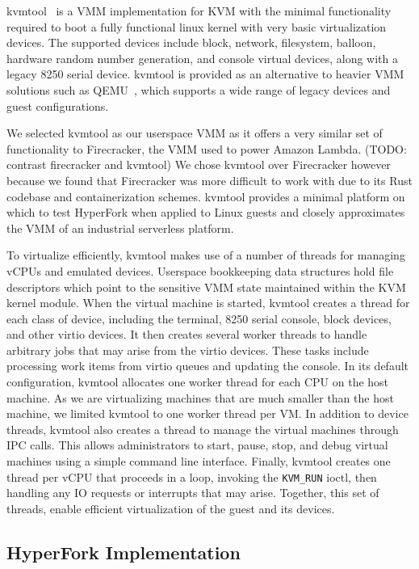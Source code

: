 kvmtool~\cite{kvmtool} is a VMM implementation for KVM with the minimal
functionality required to boot a fully functional linux kernel with very basic
virtualization devices.  The supported devices include block, network,
filesystem, balloon, hardware random number generation, and console virtual
devices, along with a legacy 8250 serial device. kvmtool is provided as an
alternative to heavier VMM solutions such as QEMU~\cite{qemu}, which supports a
wide range of legacy devices and guest configurations.

We selected kvmtool as our userspace VMM as it offers a very similar set of
functionality to Firecracker, the VMM used to power Amazon Lambda. (TODO:
contrast firecracker and kvmtool) We chose kvmtool over Firecracker however
because we found that Firecracker was more difficult to work with due to its
Rust codebase and containerization schemes. kvmtool provides a minimal
platform on which to test HyperFork when applied to Linux guests and closely
approximates the VMM of an industrial serverless platform.

To virtualize efficiently, kvmtool makes use of a number of threads for
managing vCPUs and emulated devices. Userspace bookkeeping data structures hold
file descriptors which point to the sensitive VMM state maintained within the
KVM kernel module. When the virtual machine is started, kvmtool creates a
thread for each class of device, including the terminal, 8250 serial console,
block devices, and other virtio devices. It then creates several worker threads
to handle arbitrary jobs that may arise from the virtio devices. These tasks
include processing work items from virtio queues and updating the console. In
its default configuration, kvmtool allocates one worker thread for each CPU on
the host machine. As we are virtualizing machines that are much smaller than
the host machine, we limited kvmtool to one worker thread per VM. In addition
to device threads, kvmtool also creates a thread to manage the virtual machines
through IPC calls. This allows administrators to start, pause, stop, and debug
virtual machines using a simple command line interface. Finally, kvmtool
creates one thread per vCPU that proceeds in a loop, invoking the
\texttt{KVM\_RUN} ioctl, then handling any IO requests or interrupts that may
arise. Together, this set of threads, enable efficient virtualization of the
guest and its devices.

\subsection{HyperFork Implementation}

